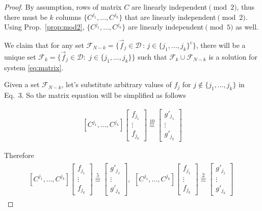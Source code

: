 \documentclass{article}
\begin{document}
\begin{proof}
By assumption, rows of matrix $C$ are linearly independent$\pmod{2}$, thus there must be $k$ columns $\{C^{j_1},\ldots,C^{j_k}\}$ that are linearly independent$\pmod{2}$. Using Prop.~\ref{prop:mod2}, $\{C^{j_1},\ldots,C^{j_k}\}$ are linearly independent$\pmod{5}$ as well.
   
   
   We claim that for any set $\mathcal{F}_{N-k}=\{\vec{f}_j\in\mathcal{D}\, : \, j \in \{j_1,\ldots,j_k\}^c \}$, there will be a unique set $\mathcal{F}_k=\{\vec{f}_j\in\mathcal{D}:\,\, j\in\{j_1,\ldots,j_k\}\}$ such that $\mathcal{F}_k \cup\mathcal{F}_{N-k}$ is a solution for system \ref{eq:matrix}.
 

 
  Given a set $\mathcal{F}_{N-k}$, let's substitute arbitrary values of $f_j$ for $j\notin\{j_1,\ldots,j_{k}\}$ in Eq.~3. So the matrix equation will be simplified as follows
 
 $$
  \begin{array}{l}
 [C^{j_1},\ldots, C^{j_k}] 
 \left[ \begin{array}{l}
 f_{j_1} \\
 \vdots \\
 f_{j_k}
 \end{array}	 \right] \overset{10}{\equiv}
 \left[\begin{array}{l}
 g'_{j_1} \\
 \vdots \\
 g'_{j_k}
 \end{array}\right] 
  \end{array} 
  $$
 
Therefore 
\begin{equation}
\label{eq:mod5}
  \begin{array}{l}
 [C^{j_1},\ldots, C^{j_k}] 
 \left[ \begin{array}{l}
 f_{j_1} \\
 \vdots \\
 f_{j_k}
 \end{array}	 \right] \overset{5}{\equiv}
 \left[\begin{array}{l}
 g'_{j_1} \\
 \vdots \\
 g'_{j_k}
 \end{array}\right],
 
  \begin{array}{l}
 [C^{j_1},\ldots, C^{j_{k}}] 
 \left[ \begin{array}{l}
 f_{j_1} \\
 \vdots \\
 f_{j_{k}}
 \end{array}	 \right] \overset{2}{\equiv}
 \left[\begin{array}{l}
 g'_{j_1} \\
 \vdots \\
 g'_{j_k}
 \end{array}\right] 
 \end{array} 
 

\end{array}
\end{equation}
\end{proof}
\end{document}
